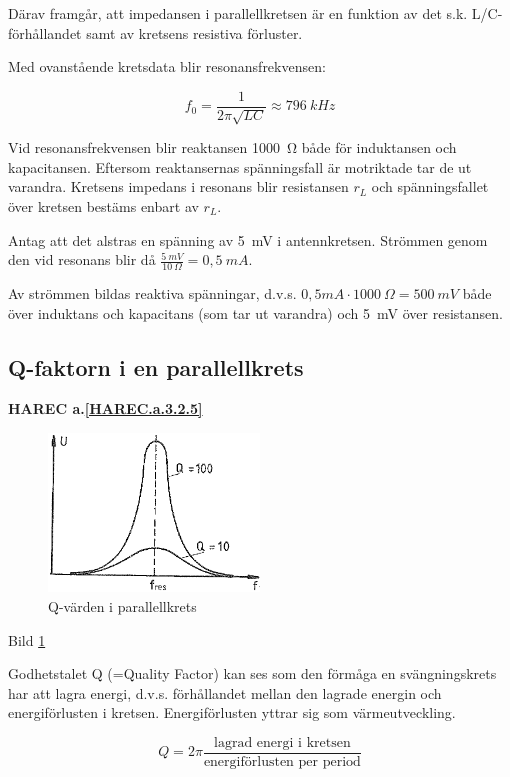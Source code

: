 Därav framgår, att impedansen i parallellkretsen är en funktion av det s.k.
L/C-förhållandet samt av kretsens resistiva förluster.

Med ovanstående kretsdata blir resonansfrekvensen:

\[
f_0 = \frac{1}{2π\sqrt{LC}} \approx 796\ kHz
\]

Vid resonansfrekvensen blir reaktansen 1000~Ω både för induktansen och
kapacitansen. Eftersom reaktansernas spänningsfall är motriktade tar de ut
varandra. Kretsens impedans i resonans blir resistansen \(r_L\) och
spänningsfallet över kretsen bestäms enbart av \(r_L\).

Antag att det alstras en spänning av 5~mV i antennkretsen. Strömmen genom den
vid resonans blir då \(\frac{5\ mV}{10\ Ω} = 0,5\ mA\).

Av strömmen bildas reaktiva spänningar, d.v.s.
\(0,5 mA \cdot 1000\ Ω = 500\ mV\) både över induktans och kapacitans (som tar
ut varandra) och 5~mV över resistansen.

\subsection{Q-faktorn i en parallellkrets}
\textbf{HAREC a.\ref{HAREC.a.3.2.5}\label{myHAREC.a.3.2.5}}
\label{Q-faktor}

\begin{figure}
\includegraphics[width=0.5\textwidth]{images/bild_2_3-20.png}
\caption{Q-värden i parallellkrets}
\label{fig:BildII3-20}
\end{figure}

Bild \ref{fig:BildII3-20}

Godhetstalet Q (=Quality Factor) kan ses som den förmåga en svängningskrets har
att lagra energi, d.v.s. förhållandet mellan den lagrade energin och
energiförlusten i kretsen. Energiförlusten yttrar sig som värmeutveckling.

\[
Q = 2π\frac{\text{lagrad energi i kretsen}}{\text{energiförlusten per period}}
\]

